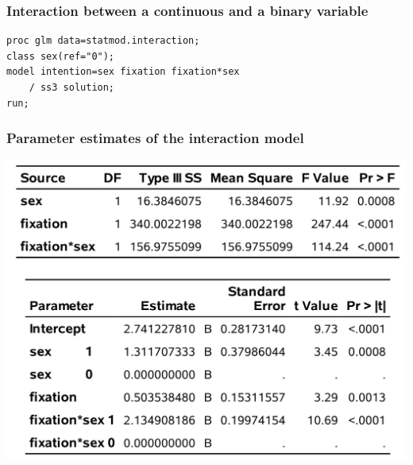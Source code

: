 \documentclass{beamer}
\begin{document}
 \begin{frame}[fragile]
\frametitle{Interaction between a continuous and a binary variable}
\begin{tcolorbox}[colback=white,colframe=hecblue,title=\SASlang code to fit a linear model with an interaction]
{\small 
\begin{verbatim}
proc glm data=statmod.interaction;
class sex(ref="0");
model intention=sex fixation fixation*sex 
    / ss3 solution;
run;
\end{verbatim}
}
\end{tcolorbox}
\end{frame}
\begin{frame}
\frametitle{Parameter estimates of the interaction model}
\begin{center}
  \includegraphics[width = 0.8\linewidth]{img/c2/slides3-e19}
\end{center}


 
\end{frame}
\end{document}
